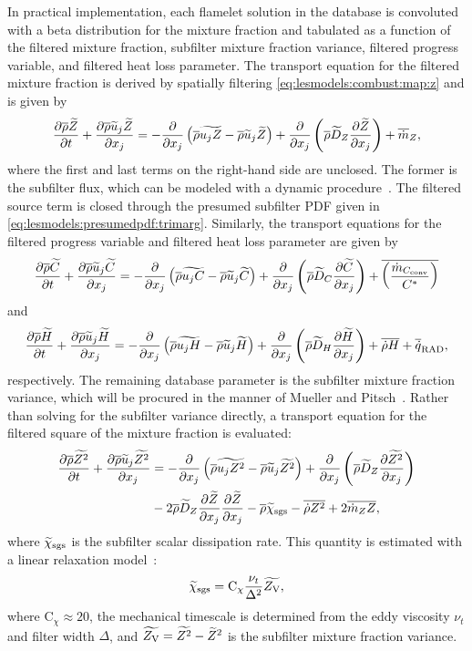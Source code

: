 In practical implementation, each flamelet solution in the database is convoluted with a beta distribution for the mixture fraction and tabulated as a function of the filtered mixture fraction, subfilter mixture fraction variance, filtered progress variable, and filtered heat loss parameter. The transport equation for the filtered mixture fraction is derived by spatially filtering \cref{eq:lesmodels:combust:map:z} and is given by
\begin{equation}\label{eq:lesmodels:presumedpdf:filteredz}
  \ftrder{\tf{Z}} = -\dsff[\tf{Z}]{\tf{u_j Z}} + \fdt[Z]{\tf{Z}} + \fst[m]{Z},
\end{equation}
where the first and last terms on the right-hand side are unclosed. The former is the subfilter flux, which can be modeled with a dynamic procedure~\cite{germano1991,lilly1992,moin1991}. The filtered source term is closed through the presumed subfilter PDF given in \cref{eq:lesmodels:presumedpdf:trimarg}. Similarly, the transport equations for the filtered progress variable and filtered heat loss parameter are given by
\begin{equation}\label{eq:lesmodels:presumedpdf:filteredc}
  \ftrder{\tf{C}} = -\dsff[\tf{C}]{\tf{u_j C}} + \fdt[C]{\tf{C}} + \mean{\left( \frac{\dot{m}_{C_{\text{conv}}}}{C^*} \right)}
\end{equation}
and
\begin{equation}\label{eq:lesmodels:presumedpdf:filteredh}
  \ftrder{\tf{H}} = -\dsff[\tf{H}]{\tf{u_j H}} + \fdt[H]{\tf{H}} + \mean{\dot{\rho}H} + \fst[q]{\text{RAD}},
\end{equation}
respectively. The remaining database parameter is the subfilter mixture fraction variance, which will be procured in the manner of Mueller and Pitsch~\cite{mueller2012}. Rather than solving for the subfilter variance directly, a transport equation for the filtered square of the mixture fraction is evaluated:
\begin{equation}\label{eq:lesmodels:presumedpdf:filteredzsq}
  \begin{split}
    \ftrder{\tf{Z^2}} &= -\dsff[\tf{Z^2}]{\tf{u_j Z^2}} + \fdt[Z]{\tf{Z^2}} \\
    &- 2\mean{\rho}\tf{D}_Z \pder[\tf{Z}]{x_j}\pder[\tf{Z}]{x_j} - \mean{\rho}\tf{\chi}_{\text{sgs}} - \mean{\dot{\rho}Z^2} + 2\mean{\dot{m}_Z Z},
  \end{split}
\end{equation}
where $\tf{\chi}_{\text{sgs}}$ is the subfilter scalar dissipation rate. This quantity is estimated with a linear relaxation model~\cite{ihme200890}:
\begin{equation}\label{eq:lesmodels:presumedpdf:chisgs}
  \tf{\chi}_{\text{sgs}} = \text{C}_{\chi}\frac{\nu_t}{\Delta^2}\tf{Z_{\text{V}}},
\end{equation}
where $\text{C}_{\chi} \approx 20$, the mechanical timescale is determined from the eddy viscosity $\nu_t$ and filter width $\Delta$, and $\tf{Z_{\text{V}}} = \tf{Z^2} - \tf{Z}^2$ is the subfilter mixture fraction variance.

